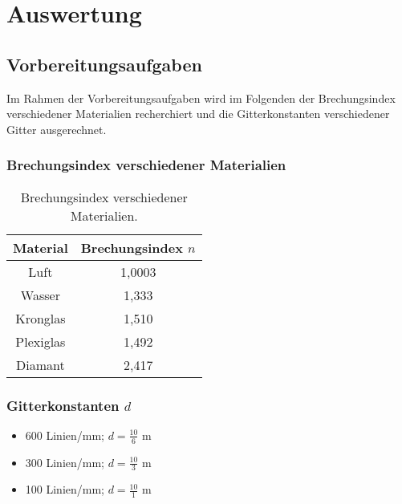 \section{Auswertung}
\label{sec:Auswertung}

\subsection{Vorbereitungsaufgaben}
Im Rahmen der Vorbereitungsaufgaben wird im Folgenden der Brechungsindex verschiedener Materialien recherchiert und die Gitterkonstanten verschiedener Gitter ausgerechnet.
\subsubsection{Brechungsindex verschiedener Materialien}
\begin{table}
  \centering
  \caption{Brechungsindex verschiedener Materialien.}
  \label{tab:Brechungsindex}
  \begin{tabular}{c c}
    \toprule
    Material & Brechungsindex $n$ \\
    \midrule
    Luft      & 1,0003 \cite{Wien} \\
    Wasser    & 1,333 \cite{Wien} \\
    Kronglas  & 1,510 \cite{Spektrum} \\
    Plexiglas & 1,492 \cite{Wiki} \\
    Diamant   & 2,417 \cite{Wien} \\
    \bottomrule
  \end{tabular}
\end{table}
\subsubsection{Gitterkonstanten $d$}
\begin{itemize}
  \item 600 Linien/mm; $d=\frac{10}{6} $ \textmu m
  \item 300 Linien/mm; $d=\frac{10}{3} $ \textmu m
  \item 100 Linien/mm; $d=\frac{10}{1} $ \textmu m
\end{itemize}

